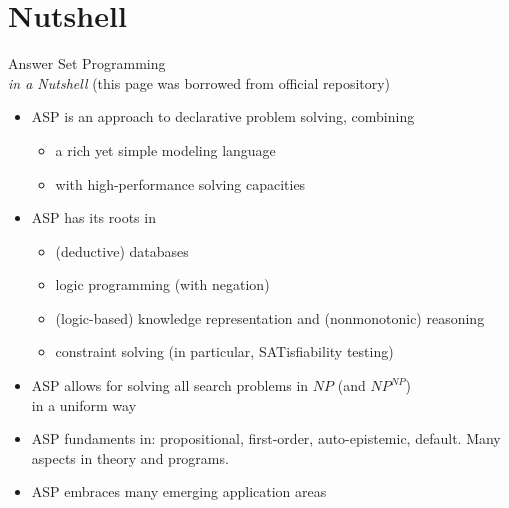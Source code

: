 \documentclass{beamer}
\begin{document}
\section{Nutshell}
\begin{frame}{Answer Set Programming\\[-2pt]{\small\emph{in a Nutshell}  (this page was borrowed from official repository)} }
  \begin{itemize}
  \item <2->
    ASP is an approach to \alert{declarative problem solving},
    combining
    \begin{itemize}
    \item a rich yet simple modeling language
    \item with high-performance solving capacities
    \end{itemize}
  \item <3-> ASP has its roots in
    \begin{itemize}
    \item (deductive) databases
    \item logic programming (with negation)
    \item (logic-based) knowledge representation and (nonmonotonic) reasoning
    \item constraint solving (in particular, SATisfiability testing)
    \end{itemize}
  \item <4-6>
    ASP allows for solving all search problems in $NP$ (and $NP^{NP}$)
    \\in a uniform way %
  \item <5-6>
    ASP fundaments in: propositional, first-order, auto-epistemic, default. Many aspects in theory and programs.
  \item <6-6> ASP embraces many emerging application areas
  \end{itemize}
\end{frame}
\end{document}
